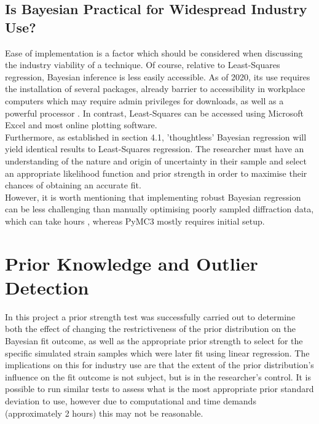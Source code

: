 \subsection{Is Bayesian Practical for Widespread Industry Use?}
\label{subsec:subsec01}

Ease of implementation is a factor which should be considered when discussing the industry viability of a technique. Of course, relative to Least-Squares regression, Bayesian inference is less easily accessible. As of 2020, its use requires the installation of several packages, already barrier to accessibility in workplace computers which may require admin privileges for downloads, as well as a powerful processor \cite{zhao_2020_fast}. In contrast, Least-Squares can be accessed using Microsoft Excel and most online plotting software. \\

Furthermore, as established in section 4.1, 'thoughtless' \cite{smidd_2020_bayesian} Bayesian regression will yield identical results to Least-Squares regression. The researcher must have an understanding of the nature and origin of uncertainty in their sample and select an appropriate likelihood function and prior strength in order to maximise their chances of obtaining an accurate fit.\\

However, it is worth mentioning that implementing robust Bayesian regression can be less challenging than manually optimising poorly sampled diffraction data, which can take hours \cite{he_2018_twodimensional}, whereas PyMC3 mostly requires initial setup. 

\section{Prior Knowledge and Outlier Detection}
\label{sec:sec01}

In this project a prior strength test was successfully carried out to determine both the effect of changing the restrictiveness of the prior distribution on the Bayesian fit outcome, as well as the appropriate prior strength to select for the specific simulated strain samples which were later fit using linear regression. The implications on this for industry use are that the extent of the prior distribution's influence on the fit outcome is not subject, but is in the researcher's control. It is possible to run similar tests to assess what is the most appropriate prior standard deviation to use, however due to computational and time demands (approximately 2 hours) this may not be reasonable.\\ 

